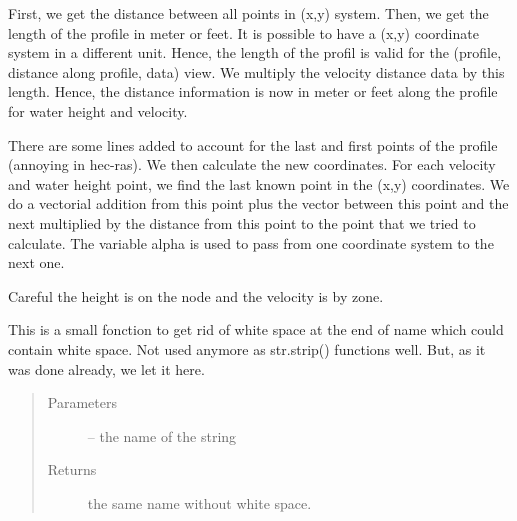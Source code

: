 \documentclass[letterpaper,10pt,english]{sphinxmanual}
\begin{document}
\begin{fulllineitems}
First, we get the distance between all points in (x,y) system. Then, we get the length of the profile in
meter or feet. It is possible to have a (x,y) coordinate system in a different unit. Hence, the length of the profil
is valid for the (profile, distance along profile, data) view. We multiply the velocity distance data by this
length. Hence, the distance information is now in meter or feet along the profile for water height and velocity.

There are some lines added to account for the last and first points of the profile (annoying in hec-ras). We then
calculate the new coordinates. For each velocity and water height point, we find the last known point in the (x,y)
coordinates. We do a vectorial addition from this point plus the vector between this point and the next multiplied
by the distance from this point to the point that we tried to calculate.  The variable alpha is used to pass from
one coordinate system to the next one.

Careful the height is on the node and the velocity is by zone.

\end{fulllineitems}


\begin{fulllineitems}
\label{\detokenize{index:src.Hec_ras06.get_rid_of_white_space}}
This is a small fonction to get rid of white space at the end of name which could contain white space. Not used
anymore as str.strip() functions well. But, as it was done already, we let it here.
\begin{quote}\begin{description}
\item[{Parameters}] \leavevmode
{} -- the name of the string

\item[{Returns}] \leavevmode
the same name without white space.

\end{description}\end{quote}

\end{fulllineitems}

\end{document}
